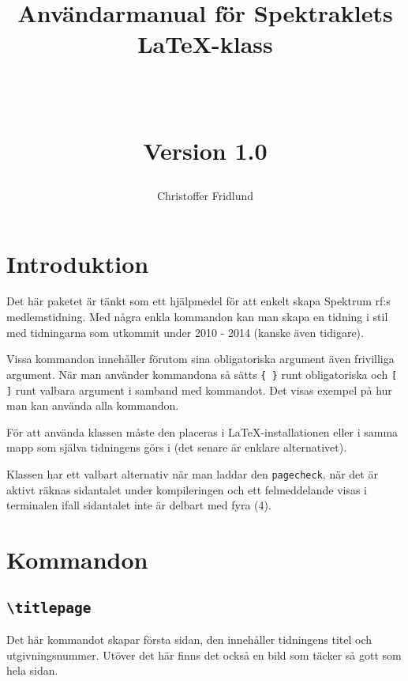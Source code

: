 \documentclass[12pt, a4paper]{article}
\title{\begin{Huge}
Användarmanual för Spektraklets \LaTeX -klass
\end{Huge}\\
\begin{large}
Version 1.0
\end{large}}
\author{Christoffer Fridlund}
\begin{document}
\maketitle
\newpage


\tableofcontents
\newpage


\section{Introduktion}

Det här paketet är tänkt som ett hjälpmedel för att enkelt skapa Spektrum rf:s medlemstidning. Med några enkla kommandon kan man skapa en tidning i stil med tidningarna som utkommit under 2010 - 2014 (kanske även tidigare).

Vissa kommandon innehåller förutom sina obligatoriska argument även frivilliga argument. När man använder kommandona så sätts \texttt{\{ \}} runt obligatoriska och \texttt{[ ]} runt valbara argument i samband med kommandot. Det visas exempel på hur man kan använda alla kommandon.

För att använda klassen måste den placeras i \LaTeX -installationen eller i samma mapp som själva tidningens görs i (det senare är enklare alternativet).

Klassen har ett valbart alternativ när man laddar den \texttt{pagecheck}, när det är aktivt räknas sidantalet under kompileringen och ett felmeddelande visas i terminalen ifall sidantalet inte är delbart med fyra (4).

\pagebreak




%
%


\section{Kommandon}

\subsection{\texttt{\textbackslash titlepage}}

Det här kommandot skapar första sidan, den innehåller tidningens titel och utgivningsnummer. Utöver det här finns det också en bild som täcker så gott som hela sidan.
\end{document}
